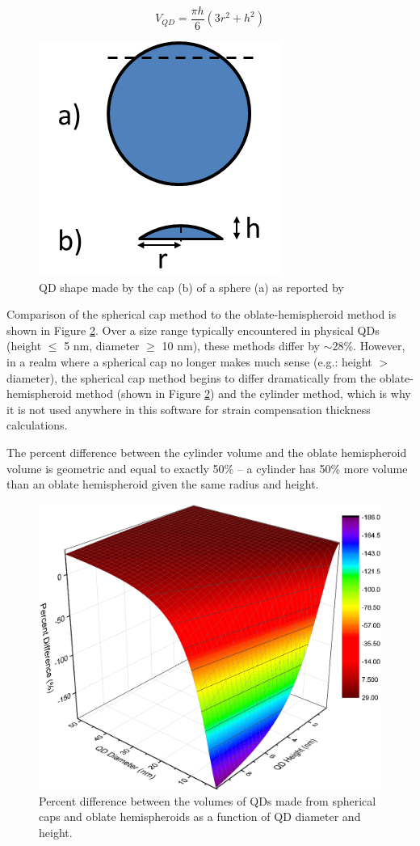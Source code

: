 \documentclass{article}
\begin{document}
\begin{equation}
\label{eq:vQDLeo}
V_{QD}=\frac{\pi h}{6}(3r^{2}+h^{2})
\end{equation}

\begin{figure}
	\includegraphics[width=0.35\linewidth]{QD_Leonard_sphcap}
	\centering
	\caption{QD shape made by the cap (b) of a sphere (a) as reported by \citeauthor{leonard_critical_1994} \cite{leonard_critical_1994}}
	\label{fig:LeonardVol}
\end{figure}

Comparison of the spherical cap method to the oblate-hemispheroid method is shown in Figure \ref{fig:LeoPDiff}. Over a size range typically encountered in physical QDs (height $\leq$ 5 nm, diameter $\geq$ 10 nm), these methods differ by $\sim$28\%. However, in a realm where a spherical cap no longer makes much sense (e.g.: height $>$ diameter), the spherical cap method begins to differ dramatically from the oblate-hemispheroid method (shown in Figure \ref{fig:LeoPDiff}) and the cylinder method, which is why it is not used anywhere in this software for strain compensation thickness calculations.

The percent difference between the cylinder volume and the oblate hemispheroid volume is geometric and equal to exactly 50\% \--- a cylinder has 50\% more volume than an oblate hemispheroid given the same radius and height.


\begin{figure}
	\includegraphics[width=0.900\linewidth]{Percent_Difference_QD_volume_3D}
	\centering
	\caption{Percent difference between the volumes of QDs made from spherical caps and oblate hemispheroids as a function of QD diameter and height.}
	\label{fig:LeoPDiff}
\end{figure}
\FloatBarrier

\printbibliography
\end{document}
